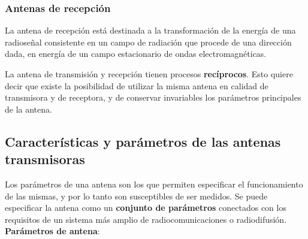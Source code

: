 \documentclass[
	12pt, %
	fleqn, %
	a4paper, %
	oneside, %
]{LegrandOrangeBook}
\begin{document}
\subsubsection*{Antenas de recepción}
La antena de recepción está destinada a la transformación de la energía de una radioseñal consistente en un campo de radiación que procede de una dirección dada, en energía de un campo estacionario de ondas electromagnéticas.
\begin{remark}
La antena de transmisión y recepción tienen procesos \textbf{recíprocos}. Esto quiere decir que existe la posibilidad de utilizar la misma antena en calidad de transmisora y de receptora, y de conservar invariables los parámetros principales de la antena.
\end{remark}
\subsection{Características y parámetros de las antenas transmisoras}
Los parámetros de una antena son los que permiten especificar el funcionamiento de las mismas, y por lo tanto son susceptibles de ser medidos. Se puede especificar la antena como un \textbf{conjunto de parámetros} conectados con los  requisitos de un sistema más amplio de radiocomunicaciones o radiodifusión.\\
\textbf{Parámetros de antena}:
\end{document}

